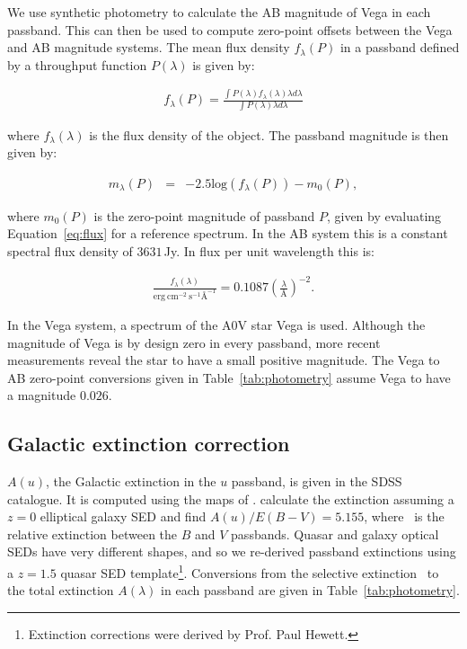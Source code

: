 We use synthetic photometry to calculate the AB magnitude of Vega in each passband.
This can then be used to compute zero-point offsets between the Vega and AB magnitude systems.
The mean flux density $f_\lambda(P)$ in a passband defined by a throughput function $P(\lambda)$ is given by:

\begingroup\makeatletter{}\check@mathfonts
\begin{eqnarray}
\label{eq:flux}
  f_\lambda(P) = \frac {\int P(\lambda)f_\lambda(\lambda)\lambda d\lambda} {\int P(\lambda)\lambda d\lambda}
\end{eqnarray}
\endgroup

\noindent where $f_\lambda(\lambda)$ is the flux density of the object.
The passband magnitude is then given by:

\begingroup\makeatletter{}\check@mathfonts
\begin{eqnarray}
\label{eq:mag}
  m_\lambda(P) & = & -2.5\text{log}(f_\lambda(P)) - m_0(P),
\end{eqnarray}
\endgroup

\noindent where $m_0(P)$ is the zero-point magnitude of passband $P$, given by evaluating Equation~\ref{eq:flux} for a reference spectrum.
In the AB system this is a constant spectral flux density of $3631$\,Jy.
In flux per unit wavelength this is:

\begingroup\makeatletter{}\check@mathfonts
\begin{eqnarray}
  \frac{f_\lambda(\lambda)}{\text{erg}~\text{cm}^{-2}~\text{s}^{-1} \text{\AA}^{-1}} = 0.1087 \left(\frac{\lambda}{\text{\AA}}\right)^{-2}.
\end{eqnarray}
\endgroup

\noindent In the Vega system, a spectrum of the A$0$V star Vega is used.
Although the magnitude of Vega is by design zero in every passband, more recent measurements reveal the star to have a small positive magnitude.
The Vega to AB zero-point conversions given in Table~\ref{tab:photometry} assume Vega to have a magnitude $0.026$.

\subsection{Galactic extinction correction}

$A(u)$, the Galactic extinction in the $u$ passband, is given in the SDSS catalogue.
It is computed using the maps of \citet{schlegel98}.
\citet{schlegel98} calculate the extinction assuming a $z=0$ elliptical galaxy SED and find $A(u)/E(B-V)=5.155$, where \ebv\, is the relative extinction between the $B$ and $V$ passbands.
Quasar and galaxy optical SEDs have very different shapes, and so we re-derived passband extinctions using a $z=1.5$ quasar SED template\footnote{Extinction corrections were derived by Prof. Paul Hewett.}.
Conversions from the selective extinction \ebv\, to the total extinction $A(\lambda)$ in each passband are given in Table~\ref{tab:photometry}.

